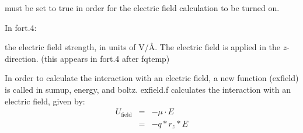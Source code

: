\documentclass[12pt,letterpaper]{article}
\begin{document}
{{{{{{{ must be set to true in order
for the electric field calculation to be turned on.

\noindent  In fort.4:

 the electric field strength, in units of V/\AA.  The electric field is applied in the
$z$-direction. (this appears in fort.4 after fqtemp)

\noindent In order to calculate the interaction with an electric field, a new function (exfield) is called in sumup,
energy, and boltz.  exfield.f calculates the interaction with an electric field, given by:
\begin{eqnarray*}
U_{\textrm{field}} & = & -\mu \cdot E \\
& = & -q * r_z * E
\end{eqnarray*}




%


}}}}}}}
\end{document}
